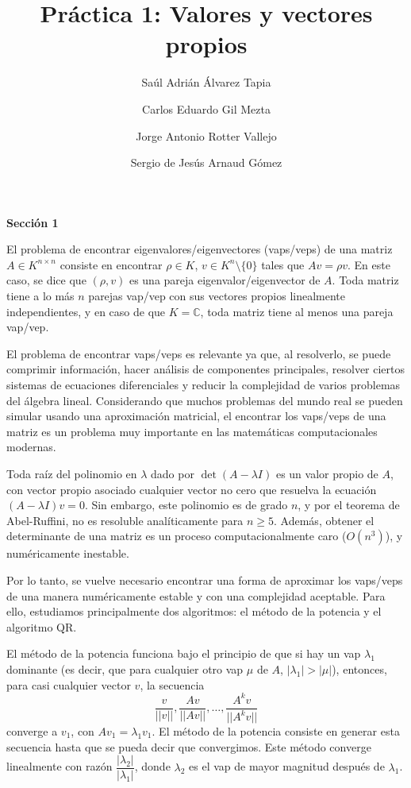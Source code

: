 \documentclass[11pt]{article}
\begin{document}
\author{Saúl Adrián Álvarez Tapia \and
	Carlos Eduardo Gil Mezta \and
	Jorge Antonio Rotter Vallejo \and
	Sergio de Jesús Arnaud Gómez}

\title{\Huge Práctica 1: Valores y vectores propios}
\date{}
\maketitle

\noindent
\textbf{\LARGE{Sección 1}}

\noindent
El problema de encontrar eigenvalores/eigenvectores (vaps/veps) de una matriz
$A\in K^{n\times n}$ consiste en encontrar $\rho \in K$,  $v\in K^n\setminus\{0\}$
tales que $Av=\rho v$. En este caso, se dice que $(\rho,v)$ es una pareja
eigenvalor/eigenvector de $A$. Toda matriz tiene a lo más $n$ parejas vap/vep
con sus vectores propios linealmente independientes, y en caso de que $K=\mathbb{C}$,
toda matriz tiene al menos una pareja vap/vep.

El problema de encontrar vaps/veps es relevante ya que, al resolverlo, se puede
comprimir información, hacer análisis de componentes principales, resolver ciertos
sistemas de ecuaciones diferenciales y reducir la complejidad de varios problemas
 del álgebra lineal. Considerando que muchos problemas del mundo real se pueden
 simular usando una aproximación matricial, el encontrar los vaps/veps de una
 matriz es un problema muy importante en las matemáticas computacionales modernas.

Toda raíz del polinomio en $\lambda$ dado por $\det(A-\lambda I)$ es un valor
propio de $A$, con vector propio asociado cualquier vector no cero que resuelva
la ecuación $(A-\lambda I)v=0$. Sin embargo, este polinomio es de grado $n$,
y por el teorema de Abel-Ruffini, no es resoluble analíticamente para $n\geq 5$.
Además, obtener el determinante de una matriz es un proceso computacionalmente
caro ($O(n^3)$), y numéricamente inestable.

Por lo tanto, se vuelve necesario encontrar una forma de aproximar los vaps/veps
de una manera numéricamente estable y con una complejidad aceptable. Para ello,
estudiamos principalmente dos algoritmos: el método de la potencia y el algoritmo QR.

El método de la potencia funciona bajo el principio de que si hay un vap
$\lambda_1$ dominante (es decir, que para cualquier otro vap $\mu$ de $A$,
$|\lambda_1|>|\mu|$), entonces, para casi cualquier vector $v$, la secuencia
\[
	\dfrac{v}{||v||},\dfrac{Av}{||Av||},\dots,\dfrac{A^kv}{||A^kv||}
\]
converge a $v_1$, con $Av_1=\lambda_1v_1$. El método de la potencia consiste en
generar esta secuencia hasta que se pueda decir que convergimos.
Este método converge linealmente con razón $\dfrac{|\lambda_2|}{|\lambda_1|}$,
donde $\lambda_2$ es el vap de mayor magnitud después de $\lambda_1$.
\end{document}
